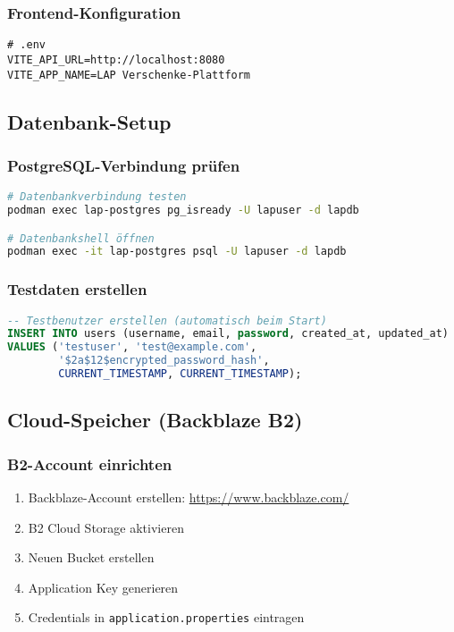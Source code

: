 \documentclass[a4paper,12pt]{article}
\begin{document}
\subsubsection{Frontend-Konfiguration}
\begin{lstlisting}[language=properties]
# .env
VITE_API_URL=http://localhost:8080
VITE_APP_NAME=LAP Verschenke-Plattform
\end{lstlisting}

\subsection{Datenbank-Setup}

\subsubsection{PostgreSQL-Verbindung prüfen}
\begin{lstlisting}[language=bash]
# Datenbankverbindung testen
podman exec lap-postgres pg_isready -U lapuser -d lapdb

# Datenbankshell öffnen
podman exec -it lap-postgres psql -U lapuser -d lapdb
\end{lstlisting}

\subsubsection{Testdaten erstellen}
\begin{lstlisting}[language=sql]
-- Testbenutzer erstellen (automatisch beim Start)
INSERT INTO users (username, email, password, created_at, updated_at)
VALUES ('testuser', 'test@example.com',
        '$2a$12$encrypted_password_hash',
        CURRENT_TIMESTAMP, CURRENT_TIMESTAMP);
\end{lstlisting}

\subsection{Cloud-Speicher (Backblaze B2)}

\subsubsection{B2-Account einrichten}
\begin{enumerate}
    \item Backblaze-Account erstellen: \url{https://www.backblaze.com/}
    \item B2 Cloud Storage aktivieren
    \item Neuen Bucket erstellen
    \item Application Key generieren
    \item Credentials in \texttt{application.properties} eintragen
\end{enumerate}
\end{document}
